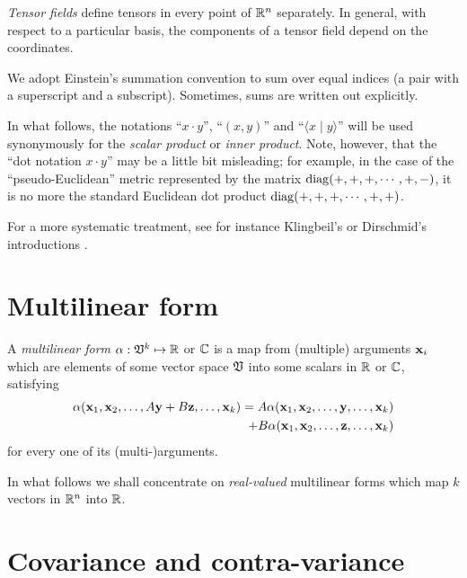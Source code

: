 {\em Tensor fields} define tensors in every point of ${\Bbb R}^n$ separately.
In general, with respect to a particular basis, the components of a tensor field
depend on the coordinates.


We adopt Einstein's summation convention to sum over equal indices
(a pair with a superscript and a subscript).
Sometimes, sums are written out explicitly.


In what follows, the notations
``$x\cdot y$'',
``$(x,y)$'' and
``$\langle x\mid y\rangle $'' will be used synonymously for the {\em
scalar product}
or
{\em inner product}.
Note, however, that the ``dot notation $x\cdot y$''
may be a little bit misleading; for example, in the case of the ``pseudo-Euclidean'' metric
represented by the matrix
 ${\rm diag}(+,+,+,\cdots ,+,-)$, it is no more the standard Euclidean dot product
${\rm diag}(+,+,+,\cdots ,+,+)$.

For a more systematic treatment, see for instance Klingbeil's
or Dirschmid's introductions
\cite{Klingbeil,Dirschmid}.


\section{Multilinear form}

A {\em multilinear form}
$\alpha :{ \frak V }^k \mapsto {\Bbb R}$  or  ${\Bbb C}$
is a map from (multiple) arguments ${\bf x}_i$ which are elements of some vector space  $\frak V$
into some scalars in ${\Bbb R}$ or ${\Bbb C}$,  satisfying
\begin{equation}
\begin{split}
\alpha ( {\bf x}_1,{\bf x}_2,\ldots , A {\bf y}+ B {\bf z}, \ldots ,{\bf x}_k)
=
A\alpha ( {\bf x}_1,{\bf x}_2,\ldots , {\bf y}, \ldots ,{\bf x}_k)   \\
   \qquad +
B\alpha ( {\bf x}_1,{\bf x}_2,\ldots , {\bf z}, \ldots ,{\bf x}_k)
\end{split}
\end{equation}
for every one of its (multi-)arguments.

In what follows we shall concentrate on {\em real-valued} multilinear forms which map
$k$ vectors in
${\Bbb R}^n$
into
${\Bbb R}$.


\section{Covariance and contra-variance}

